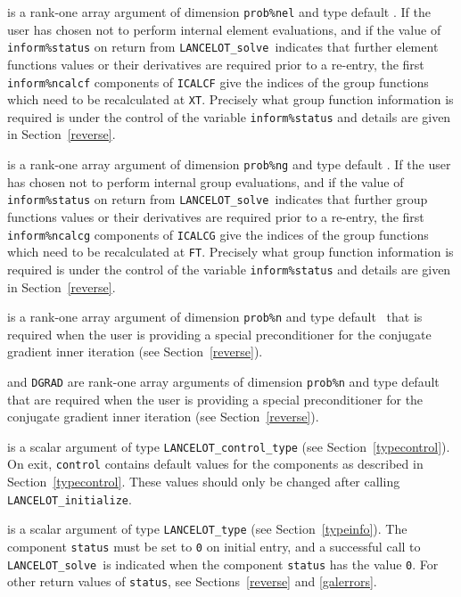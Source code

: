 \documentclass{galahad}
\newcommand{\fullpackagename}{LANC\-E\-LOT}
\newcommand{\solver}{{\tt \fullpackagename\_solve}}
\begin{document}
\begin{description}
 is a rank-one \intentinout array argument of
dimension {\tt prob\%nel} and type default \integer.
If the user has chosen not to perform internal element evaluations,
and if the value of {\tt inform\%status} on return from \solver\
indicates that further element functions values or their derivatives
are required prior to a re-entry,
the first {\tt inform\%ncalcf} components of {\tt ICALCF} give the
indices of the group functions which need to be
recalculated at {\tt XT}.
Precisely what group function information
is required is under the control of the
variable {\tt inform\%status} and details are given in Section~\ref{reverse}.

 is a rank-one \intentinout array argument of
dimension {\tt prob\%ng} and type default \integer.
If the user has chosen not to perform internal group evaluations,
and if the value of {\tt inform\%status} on return from \solver\
indicates that further group functions values or their derivatives
are required prior to a re-entry,
the first {\tt inform\%ncalcg} components of {\tt ICALCG} give the
indices of the group functions which need to be
recalculated at {\tt FT}.
Precisely what group function information
is required is under the control of the
variable {\tt inform\%status} and details are given in Section~\ref{reverse}.

\itt{IVAR} is a rank-one \intentinout array argument of
dimension {\tt prob\%n} and type default \integer\, that is
required when the user is providing a special preconditioner
for the conjugate gradient inner iteration (see Section~\ref{reverse}).

\itt{Q} and {\tt DGRAD} are rank-one \intentinout array arguments of
dimension {\tt prob\%n} and type default \realdp\, that are
required when the user is providing a special preconditioner
for the conjugate gradient inner iteration
(see Section~\ref{reverse}).

 is a scalar \intentinout argument of type
{\tt \fullpackagename\_control\_type}
(see Section~\ref{typecontrol}). On exit, {\tt control} contains default
values for the components as described in Section~\ref{typecontrol}.
These values should only be changed after calling
{\tt \fullpackagename\_initialize}.

 is a scalar \intentinout argument of type
{\tt \fullpackagename\_type}
(see Section~\ref{typeinfo}). The component {\tt status} must be set to
{\tt 0} on initial entry, and a successful call to
\solver\ is indicated when the  component {\tt status} has the value {\tt 0}.
For other return values of {\tt status}, see Sections~\ref{reverse} and
\ref{galerrors}.


\end{description}
\end{document}
